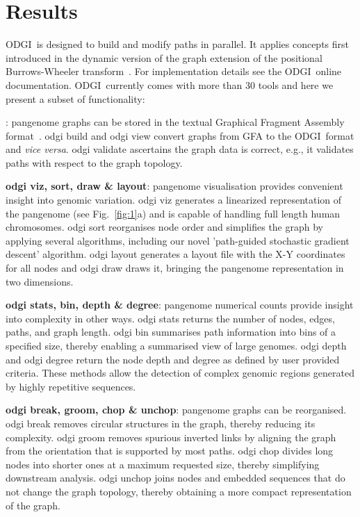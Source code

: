 \documentclass{bioinfo}
\newcommand{\odgi}{ODGI}
\newcommand{\cmd}[1]{\textrm{#1}}
\newcommand{\cmdbf}[1]{{\textbf{#1}}}
\newcommand{\topic}[1]{{\cmdbf{#1}}:}
\begin{document}
    \vspace{-0.1in}

    \section{Results}

    \odgi\ is designed to build and modify paths in parallel. It
    applies concepts first introduced in the dynamic version of the
    graph extension of the positional Burrows-Wheeler
    transform~\citep{Siren:2020}. For implementation details see the
    \odgi\ online documentation. \odgi\ currently comes with more than 30
    tools and here we present a subset of functionality:

    \indent \topic{odgi build, view \& validate} pangenome graphs can be
    stored in the textual Graphical Fragment Assembly
    format~\citep{GFA}. \cmd{odgi build} and \cmd{odgi view}
    convert graphs from GFA to the \odgi\ format and \textit{vice versa}.
    \cmd{odgi validate} ascertains the graph data is correct, e.g.,
    it validates paths with respect to the graph topology.

    \topic{odgi viz, sort, draw \& layout} pangenome visualisation
    provides convenient insight into genomic variation. \cmd{odgi viz}
    generates a linearized representation of the pangenome (see Fig.~\ref{fig:1}a)
    and is capable of handling full length human chromosomes. \cmd{odgi sort}
    reorganises node order and simplifies the graph by applying several
    algorithms, including our novel 'path-guided stochastic gradient descent'
    algorithm. \cmd{odgi layout} generates a layout file with the X-Y
    coordinates for all nodes and \cmd{odgi draw} draws it, bringing
    the pangenome representation in two dimensions.

    \topic{odgi stats, bin, depth \& degree} pangenome numerical
    counts provide insight into complexity in other
    ways. \cmd{odgi stats} returns the number of nodes,
    edges, paths, and graph length. \cmd{odgi bin} summarises path
    information into bins of a specified size, thereby enabling a
    summarised view of large genomes. \cmd{odgi depth} and
    \cmd{odgi degree} return the node depth and degree as defined by
    user provided criteria. These methods allow the detection of complex
    genomic regions generated by highly repetitive sequences.

    \topic{odgi break, groom, chop \& unchop} pangenome graphs can be
    reorganised. \cmd{odgi break} removes circular structures in the
    graph, thereby reducing its complexity. \cmd{odgi groom} removes
    spurious inverted links by aligning the graph from the orientation
    that is supported by most paths. \cmd{odgi chop} divides long
    nodes into shorter ones at a maximum requested size, thereby
    simplifying downstream analysis. \cmd{odgi unchop} joins nodes
    and embedded sequences that do not change the graph topology,
    thereby obtaining a more compact representation of the graph.
\end{document}
